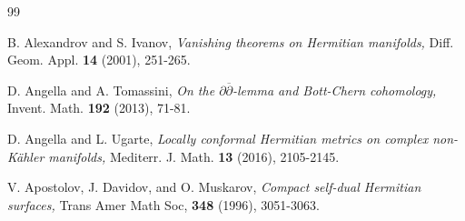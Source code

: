 \documentclass{amsart}
\newcommand{\vs}{\vspace{0.5cm}}
\begin{document}
\vs

\begin{thebibliography}{99}

 B. Alexandrov and S. Ivanov,  \emph{Vanishing theorems on Hermitian manifolds,} Diff. Geom. Appl. {\bf 14} (2001),  251-265.







       


 D. Angella and A. Tomassini, \emph{On the $\partial \overline{\partial}$-lemma and Bott-Chern cohomology,}  Invent. Math. {\bf 192} (2013), 71-81.

  D. Angella and L. Ugarte,   \emph{Locally conformal Hermitian metrics on complex non-K\"ahler manifolds,} Mediterr. J. Math. {\bf 13} (2016), 2105-2145.




 V. Apostolov, J. Davidov, and O. Muskarov, \emph{Compact self-dual Hermitian surfaces,}  Trans Amer Math Soc, {\bf 348} (1996), 3051-3063.





\end{thebibliography}
\end{document}
